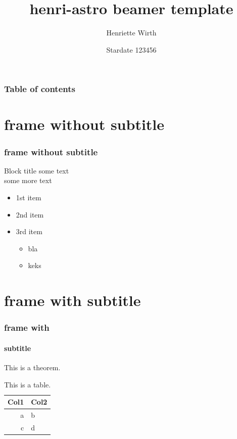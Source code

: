 \documentclass{beamer}
\title{henri-astro beamer template}
\date{Stardate 123456}
\author{Henriette Wirth}
\begin{document}
\begin{frame}[noframenumbering]
\titlepage
\end{frame}


\begin{frame}
  \frametitle{Table of contents}
  \tableofcontents
\end{frame}


\section{frame without subtitle}
\begin{frame}
  \frametitle{frame without subtitle}
  
  \begin{block}{Block title}
    some text\\
    some more text
  \end{block}  
  
  \begin{itemize}
     \item<1-| alert@1> 1st item
     \item<2-> 2nd item
     \item<3-> 3rd item
     \begin{itemize}
       \item<3-> bla
       \item<3-> keks
     \end{itemize}
  \end{itemize}
\end{frame}


\section{frame with subtitle}
\begin{frame}
  \frametitle{frame with}
  \framesubtitle{subtitle}
  
  \begin{theorem}
    This is a theorem.
  \end{theorem}  
  
  \begin{table}
    \caption{This is a table.}
    \begin{tabular}{r|l}
      Col1 & Col2 \\\hline
      a & b \\
      c & d
    \end{tabular}
  \end{table}
\end{frame}
\end{document}
